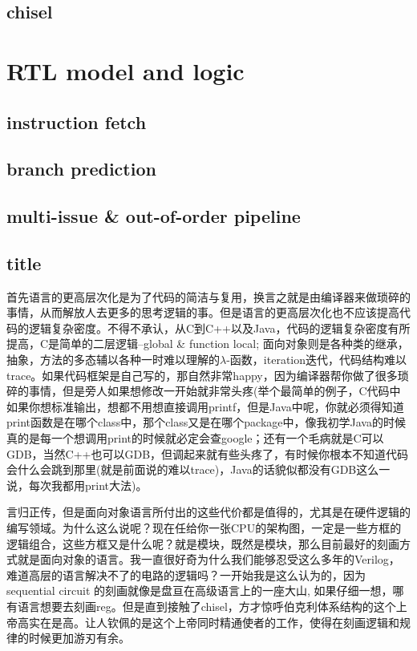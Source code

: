 \documentclass[11pt]{article}
\begin{document}
\subsection{chisel}

\section{RTL model and logic}

\subsection{instruction fetch}

\subsection{branch prediction}

\subsection{multi-issue \& out-of-order pipeline}

\subsection{title}


首先语言的更高层次化是为了代码的简洁与复用，换言之就是由编译器来做琐碎的事情，从而解放人去更多的思考逻辑的事。但是语言的更高层次化也不应该提高代码的逻辑复杂密度。不得不承认，从C到C++以及Java，代码的逻辑复杂密度有所提高，C是简单的二层逻辑--global \& function local; 面向对象则是各种类的继承，抽象，方法的多态辅以各种一时难以理解的$ \lambda $-函数，iteration迭代，代码结构难以trace。如果代码框架是自己写的，那自然非常happy，因为编译器帮你做了很多琐碎的事情，但是旁人如果想修改一开始就非常头疼(举个最简单的例子，C代码中如果你想标准输出，想都不用想直接调用printf，但是Java中呢，你就必须得知道print函数是在哪个class中，那个class又是在哪个package中，像我初学Java的时候真的是每一个想调用print的时候就必定会查google；还有一个毛病就是C可以GDB，当然C++也可以GDB，但调起来就有些头疼了，有时候你根本不知道代码会什么会跳到那里(就是前面说的难以trace)，Java的话貌似都没有GDB这么一说，每次我都用print大法)。

言归正传，但是面向对象语言所付出的这些代价都是值得的，尤其是在硬件逻辑的编写领域。为什么这么说呢？现在任给你一张CPU的架构图，一定是一些方框的逻辑组合，这些方框又是什么呢？就是模块，既然是模块，那么目前最好的刻画方式就是面向对象的语言。我一直很好奇为什么我们能够忍受这么多年的Verilog，难道高层的语言解决不了的电路的逻辑吗？一开始我是这么认为的，因为sequential circuit 的刻画就像是盘亘在高级语言上的一座大山, 如果仔细一想，哪有语言想要去刻画reg。但是直到接触了chisel，方才惊呼伯克利体系结构的这个上帝高实在是高。让人钦佩的是这个上帝同时精通使者的工作，使得在刻画逻辑和规律的时候更加游刃有余。
\end{document}
